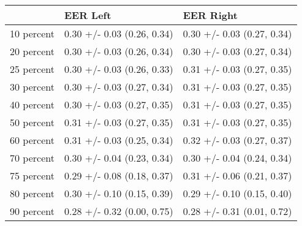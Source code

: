 \begin{tabular}{lll}
\toprule
{} &                    EER Left &                   EER Right \\
\midrule
10 percent &  0.30 +/- 0.03 (0.26, 0.34) &  0.30 +/- 0.03 (0.27, 0.34) \\
20 percent &  0.30 +/- 0.03 (0.26, 0.34) &  0.30 +/- 0.03 (0.27, 0.34) \\
25 percent &  0.30 +/- 0.03 (0.26, 0.33) &  0.31 +/- 0.03 (0.27, 0.35) \\
30 percent &  0.30 +/- 0.03 (0.27, 0.34) &  0.31 +/- 0.03 (0.27, 0.35) \\
40 percent &  0.30 +/- 0.03 (0.27, 0.35) &  0.31 +/- 0.03 (0.27, 0.35) \\
50 percent &  0.31 +/- 0.03 (0.27, 0.35) &  0.31 +/- 0.03 (0.27, 0.35) \\
60 percent &  0.31 +/- 0.03 (0.25, 0.34) &  0.32 +/- 0.03 (0.27, 0.37) \\
70 percent &  0.30 +/- 0.04 (0.23, 0.34) &  0.30 +/- 0.04 (0.24, 0.34) \\
75 percent &  0.29 +/- 0.08 (0.18, 0.37) &  0.31 +/- 0.06 (0.21, 0.37) \\
80 percent &  0.30 +/- 0.10 (0.15, 0.39) &  0.29 +/- 0.10 (0.15, 0.40) \\
90 percent &  0.28 +/- 0.32 (0.00, 0.75) &  0.28 +/- 0.31 (0.01, 0.72) \\
\bottomrule
\end{tabular}
